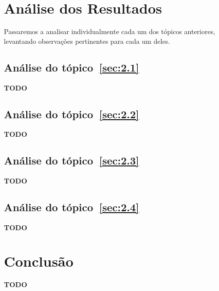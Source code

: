 \documentclass[12pt]{article}
\begin{document}
\section{Análise dos Resultados}\label{sec:resultados}

Passaremos a analisar individualmente cada um dos tópicos anteriores, levantando
observações pertinentes para cada um deles.

\subsection{Análise do tópico~\ref{sec:2.1}}\label{sec:analise2.1}

\textbf{TODO}

\subsection{Análise do tópico~\ref{sec:2.2}}\label{sec:analise2.2}

\textbf{TODO}

\subsection{Análise do tópico~\ref{sec:2.3}}\label{sec:analise2.3}

\textbf{TODO}

\subsection{Análise do tópico~\ref{sec:2.4}}\label{sec:analise2.4}

\textbf{TODO}

\section{Conclusão}\label{sec:Conclusao}

\textbf{TODO}


\end{document}
